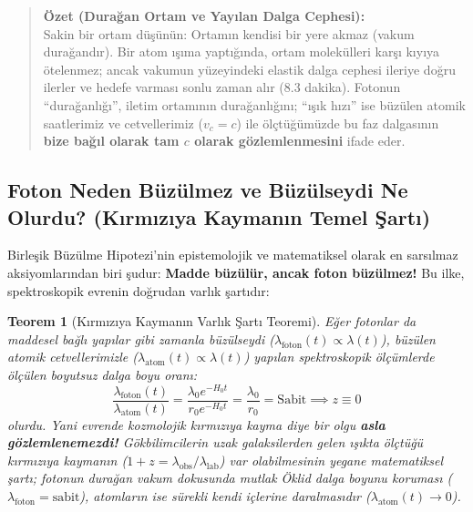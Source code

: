 \documentclass[11pt,a4paper]{article}
\newtheorem{theorem}{Teorem}[section]
\begin{document}
\begin{quote}
    \small
    \textbf{Özet (Durağan Ortam ve Yayılan Dalga Cephesi):} \\
    Sakin bir ortam düşünün: Ortamın kendisi bir yere akmaz (vakum durağandır). Bir atom ışıma yaptığında, ortam molekülleri karşı kıyıya ötelenmez; ancak vakumun yüzeyindeki elastik dalga cephesi ileriye doğru ilerler ve hedefe varması sonlu zaman alır ($8.3$ dakika). Fotonun ``durağanlığı'', iletim ortamının durağanlığını; ``ışık hızı'' ise büzülen atomik saatlerimiz ve cetvellerimiz ($v_c = c$) ile ölçtüğümüzde bu faz dalgasının \textbf{bize bağıl olarak tam $c$ olarak gözlemlenmesini} ifade eder.
\end{quote}

\subsection{Foton Neden Büzülmez ve Büzülseydi Ne Olurdu? (Kırmızıya Kaymanın Temel Şartı)}
\label{sec:foton_neden_buzulmez_em}

Birleşik Büzülme Hipotezi'nin epistemolojik ve matematiksel olarak en sarsılmaz aksiyomlarından biri şudur: \textbf{Madde büzülür, ancak foton büzülmez!} Bu ilke, spektroskopik evrenin doğrudan varlık şartıdır:

\begin{theorem}[Kırmızıya Kaymanın Varlık Şartı Teoremi]
    \label{thm:kirmiziya_kayma_varlik_sarti_p2}
    Eğer fotonlar da maddesel bağlı yapılar gibi zamanla büzülseydi ($\lambda_{\mathrm{foton}}(t) \propto \lambda(t)$), büzülen atomik cetvellerimizle ($\lambda_{\mathrm{atom}}(t) \propto \lambda(t)$) yapılan spektroskopik ölçümlerde ölçülen boyutsuz dalga boyu oranı:
    \begin{equation}
        \frac{\lambda_{\mathrm{foton}}(t)}{\lambda_{\mathrm{atom}}(t)} = \frac{\lambda_0 e^{-H_0 t}}{r_0 e^{-H_0 t}} = \frac{\lambda_0}{r_0} = \text{Sabit} \implies z \equiv 0
    \end{equation}
    olurdu. Yani evrende kozmolojik kırmızıya kayma diye bir olgu \textbf{asla gözlemlenemezdi!} Gökbilimcilerin uzak galaksilerden gelen ışıkta ölçtüğü kırmızıya kaymanın ($1+z = \lambda_{\mathrm{obs}}/\lambda_{\mathrm{lab}}$) var olabilmesinin yegane matematiksel şartı; fotonun durağan vakum dokusunda mutlak Öklid dalga boyunu koruması ($\lambda_{\mathrm{foton}} = \text{sabit}$), atomların ise sürekli kendi içlerine daralmasıdır ($\lambda_{\mathrm{atom}}(t) \to 0$).
\end{theorem}
\end{document}
